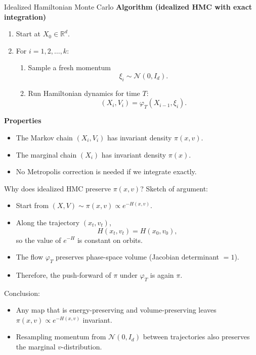 \documentclass{beamer}
\begin{document}
\begin{frame}{Idealized Hamiltonian Monte Carlo}
  \textbf{Algorithm (idealized HMC with exact integration)}
  \begin{enumerate}
    \item Start at $X_0 \in \mathbb{R}^d$.
    \item For $i = 1,2,\dots,k$:
      \begin{enumerate}
        \item Sample a fresh momentum
          \[
            \xi_i \sim \mathcal{N}(0, I_d).
          \]
        \item Run Hamiltonian dynamics for time $T$:
          \[
            (X_i, V_i) = \varphi_T(X_{i-1}, \xi_i).
          \]
      \end{enumerate}
  \end{enumerate}

  \vspace{0.2cm}
  \textbf{Properties}
  \begin{itemize}
    \item The Markov chain $(X_i, V_i)$ has invariant density $\pi(x,v)$.
    \item The marginal chain $(X_i)$ has invariant density $\pi(x)$.
    \item No Metropolis correction is needed if we integrate exactly.
  \end{itemize}
\end{frame}

\begin{frame}{Why does idealized HMC preserve $\pi(x,v)$?}
  Sketch of argument:
  \begin{itemize}
    \item Start from $(X,V) \sim \pi(x,v) \propto e^{-H(x,v)}$.
    \item Along the trajectory $(x_t,v_t)$,
      \[
        H(x_t,v_t) = H(x_0,v_0),
      \]
      so the value of $e^{-H}$ is constant on orbits.
    \item The flow $\varphi_T$ preserves phase-space volume
          (Jacobian determinant $=1$).
    \item Therefore, the push-forward of $\pi$ under $\varphi_T$ is again $\pi$.
  \end{itemize}

  \vspace{0.2cm}
  Conclusion:
  \begin{itemize}
    \item Any map that is energy-preserving and volume-preserving leaves
          $\pi(x,v) \propto e^{-H(x,v)}$ invariant.
    \item Resampling momentum from $\mathcal{N}(0,I_d)$ between trajectories
          also preserves the marginal $v$-distribution.
  \end{itemize}
\end{frame}
\end{document}

